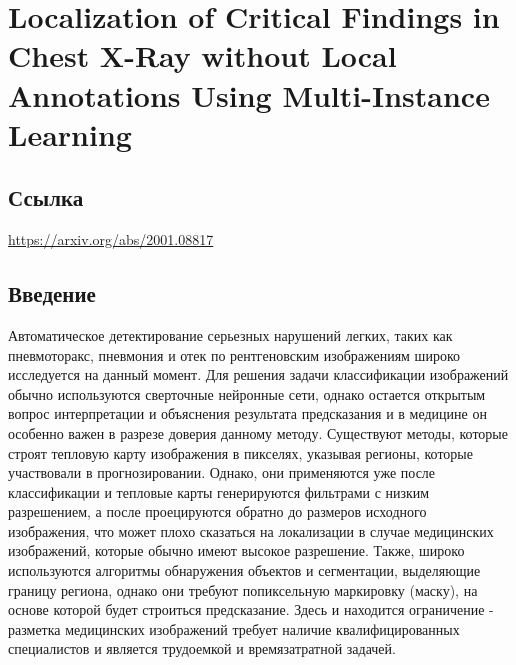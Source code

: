 \section{Localization of Critical Findings in Chest X-Ray without Local Annotations Using Multi-Instance Learning}

\subsection*{Ссылка} \url{https://arxiv.org/abs/2001.08817}
\subsection*{Введение}
Автоматическое детектирование серьезных нарушений легких, таких как пневмоторакс, пневмония и отек по рентгеновским 
изображениям широко исследуется на данный момент. Для решения задачи классификации изображений обычно используются 
сверточные нейронные сети, однако остается открытым вопрос интерпретации и объяснения результата предсказания и в 
медицине он особенно важен в разрезе доверия данному методу. Существуют методы, которые строят тепловую карту изображения 
в пикселях, указывая регионы, которые участвовали в прогнозировании. Однако, они применяются уже после классификации и 
тепловые карты генерируются фильтрами с низким разрешением, а после проецируются обратно до размеров исходного изображения, 
что может плохо сказаться на локализации в случае медицинских изображений, которые обычно имеют высокое разрешение. 
Также, широко используются алгоритмы обнаружения объектов и сегментации, выделяющие границу региона, однако они требуют 
попиксельную маркировку (маску), на основе которой будет строиться предсказание. Здесь и находится ограничение - 
разметка медицинских изображений требует наличие квалифицированных специалистов и является трудоемкой и времязатратной задачей.
